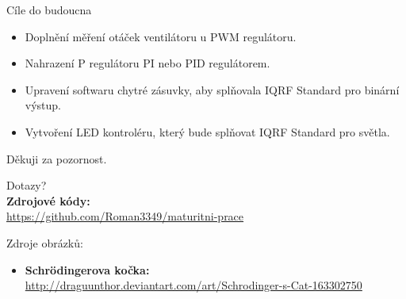\documentclass[11pt]{beamer}
\begin{document}
\begin{frame}{Cíle do budoucna}
  \begin{itemize}
    \item Doplnění měření otáček ventilátoru u PWM regulátoru.
    \item Nahrazení P regulátoru PI nebo PID regulátorem.
    \item Upravení softwaru chytré zásuvky, aby splňovala IQRF Standard pro binární výstup.
    \item Vytvoření LED kontroléru, který bude splňovat IQRF Standard pro světla.
  \end{itemize}
\end{frame}

\begin{frame}
  \begin{center}
    \begin{huge}
    Děkuji za pozornost. \\[8mm]
    \end{huge}
    \large{Dotazy?}\\[16mm]
    \textbf{Zdrojové kódy:} \\
    \url{https://github.com/Roman3349/maturitni-prace} \\[16mm]
  \end{center}
  Zdroje obrázků:
  \begin{itemize}
    \item[] \hspace{-8mm} \tiny{\textbf{Schrödingerova kočka:} \url{http://draguunthor.deviantart.com/art/Schrodinger-s-Cat-163302750}}
  \end{itemize}
\end{frame}
\end{document}
